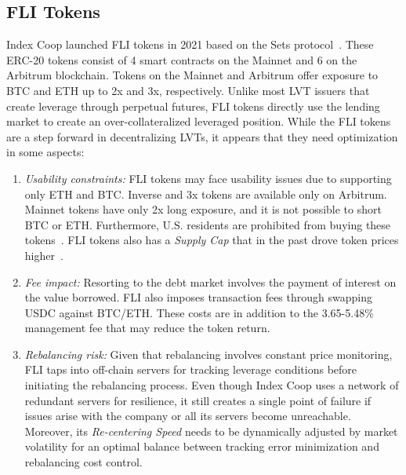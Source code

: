 \subsection{FLI Tokens}\label{subsec:fli}
Index Coop launched FLI tokens in 2021 based on the Sets protocol~\cite{FLI_Sets}. These ERC-20 tokens consist of 4 smart contracts on the Mainnet and 6 on the Arbitrum blockchain. Tokens on the Mainnet and Arbitrum offer exposure to BTC and ETH up to 2x and 3x, respectively. Unlike most LVT issuers that create leverage through perpetual futures, FLI tokens directly use the lending market to create an over-collateralized leveraged position. While the FLI tokens are a step forward in decentralizing LVTs, it appears that they need optimization in some aspects:
\begin{enumerate}[label={\ref{subsec:fli}.\arabic*},leftmargin=*]
	\item \textit{Usability constraints:} FLI tokens may face usability issues due to supporting only ETH and BTC. Inverse and 3x tokens are available only on Arbitrum. Mainnet tokens have only 2x long exposure, and it is not possible to short BTC or ETH. Furthermore, U.S. residents are prohibited from buying these tokens~\cite{FLI_Restricted}. FLI tokens also has a \textit{Supply Cap} that in the past drove token prices higher~\cite{FLI_Shortage}.
	
	\item \textit{Fee impact:} Resorting to the debt market involves the payment of interest on the value borrowed. FLI also imposes transaction fees through swapping USDC against BTC/ETH. These costs are in addition to the 3.65-5.48\% management fee that may reduce the token return.
	
	\item \textit{Rebalancing risk:} Given that rebalancing involves constant price monitoring, FLI taps into off-chain servers for tracking leverage conditions before initiating the rebalancing process. Even though Index Coop uses a network of redundant servers for resilience, it still creates a single point of failure if issues arise with the company or all its servers become unreachable. Moreover, its \textit{Re-centering Speed} needs to be dynamically adjusted by market volatility for an optimal balance between tracking error minimization and rebalancing cost control.
\end{enumerate}

